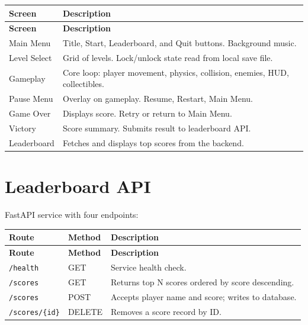\documentclass[12pt, letterpaper]{article}
\begin{document}
\begin{longtable}{p{3.5cm} p{9.5cm}}
    \toprule
    \textbf{Screen} & \textbf{Description} \\
    \midrule
    \endfirsthead
    \toprule
    \textbf{Screen} & \textbf{Description} \\
    \midrule
    \endhead
    \bottomrule
    \endfoot
    Main Menu      & Title, Start, Leaderboard, and Quit buttons. Background music. \\
    \addlinespace
    Level Select   & Grid of levels. Lock/unlock state read from local save file. \\
    \addlinespace
    Gameplay       & Core loop: player movement, physics, collision, enemies, HUD, collectibles. \\
    \addlinespace
    Pause Menu     & Overlay on gameplay. Resume, Restart, Main Menu. \\
    \addlinespace
    Game Over      & Displays score. Retry or return to Main Menu. \\
    \addlinespace
    Victory        & Score summary. Submits result to leaderboard API. \\
    \addlinespace
    Leaderboard    & Fetches and displays top scores from the backend. \\
\end{longtable}

\section{Leaderboard API}

FastAPI service with four endpoints:

\begin{longtable}{p{4cm} p{1.8cm} p{7.2cm}}
    \toprule
    \textbf{Route} & \textbf{Method} & \textbf{Description} \\
    \midrule
    \endfirsthead
    \toprule
    \textbf{Route} & \textbf{Method} & \textbf{Description} \\
    \midrule
    \endhead
    \bottomrule
    \endfoot
    \texttt{/health}         & GET    & Service health check. \\
    \texttt{/scores}         & GET    & Returns top N scores ordered by score descending. \\
    \texttt{/scores}         & POST   & Accepts player name and score; writes to database. \\
    \texttt{/scores/\{id\}}  & DELETE & Removes a score record by ID. \\
\end{longtable}
\end{document}
